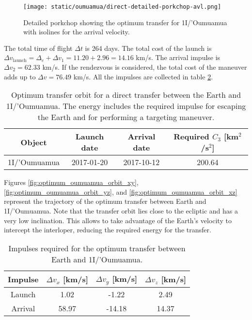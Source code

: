 \begin{figure}[H]
  \centering
  \texttt{[image: static/oumuamua/direct-detailed-porkchop-avl.png]}
        \caption[Detailed porkchop showing the optimum transfer for
        1I/'Oumuamua with the arrival velocity.]{Detailed porkchop showing the
        optimum transfer for 1I/'Oumuamua with isolines for the arrival
        velocity.}
  \label{fig:oumuamua-optimum-porkchop-avl}
\end{figure}

The total time of flight $\Delta t$ is 264 days. The total cost of the launch is
$\Delta v_\text{launch} = \Delta_e + \Delta v_1 = 11.20 + 2.96 = 14.16$ km/s.
The arrival impulse is $\Delta v_2 = 62.33$ km/s. If the rendezvous is
considered, the total cost of the maneuver adds up to $\Delta v = 76.49$ km/s.
All the impulses are collected in table
\ref{tab:oumuamua-direct-transfer-impulses}.

\vspace{1cm}
\begin{table}[H]
  \centering
  \begin{tabular}{|c|c|c|c|}
    \hline
    Object & Launch date & Arrival date & Required $C_3$ [km$^2$/s$^2$] \\
    \hline
    1I/'Oumuamua & 2017-01-20 & 2017-10-12 & 200.64 \\
    \hline
  \end{tabular}
  \caption[Optimum transfer orbit for a direct transfer between the Earth and
        1I/'Oumuamua.]{Optimum transfer orbit for a direct transfer between the
        Earth and 1I/'Oumuamua. The energy includes the required impulse for
        escaping the Earth and for performing a targeting maneuver.}
  \label{tab:oumuamua-direct-transfer-optimum}
\end{table}

Figures \ref{fig:optimum_oumuamua_orbit_xy},
\ref{fig:optimum_oumuamua_orbit_yz}, and \ref{fig:optimum_oumuamua_orbit_xz}
represent the trajectory of the optimum transfer between Earth and 1I/'Oumuamua.
Note that the transfer orbit lies close to the ecliptic and has a very low
inclination. This allows to take advantage of the Earth's velocity to intercept
the interloper, reducing the required energy for the transfer.

\vspace{1cm}
\begin{table}[H]
  \centering
  \begin{tabular}{|c|c|c|c|}
    \hline
    Impulse & $\Delta v_x$ [km/s] & $\Delta v_y$ [km/s] & $\Delta v_z$ [km/s] \\
    \hline
    Launch & 1.02 & -1.22 & 2.49 \\
    \hline
    Arrival & 58.97 & -14.18 & 14.37 \\
    \hline
  \end{tabular}
  \caption{Impulses required for the optimum transfer between Earth and 1I/'Oumuamua.}
  \label{tab:oumuamua-direct-transfer-impulses}
\end{table}

